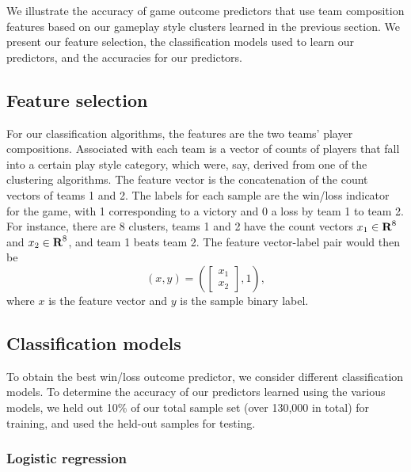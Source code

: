 \documentclass[letterpaper,10 pt,conference]{ieeeconf}
\begin{document}
We illustrate the accuracy of game outcome predictors that use team composition features based on our gameplay style clusters learned in the previous section. We present our feature selection, the classification models used to learn our predictors, and the accuracies for our predictors. 

\subsection{Feature selection}

For our classification algorithms, the features are the two teams' player compositions. Associated with each team is a vector of counts of players that fall into a certain play style category, which were, say, derived from one of the clustering algorithms. The feature vector is the concatenation of the count vectors of teams 1 and 2. The labels for each sample are the win/loss indicator for the game, with 1 corresponding to a victory and 0 a loss by team 1 to team 2. For instance, there are 8 clusters, teams 1 and 2 have the count vectors $x_{1}\in{\mbox{\bf R}}^{8}$ and $x_{2}\in{\mbox{\bf R}}^{8}$, and team 1 beats team 2. The feature vector-label pair would then be 
\[
  \left(x, y\right) = 
  \left(
    \left[
      \begin{array}{c}
        x_{1} \\ 
        x_{2}
      \end{array}
    \right],
    1
  \right),
\]
where $x$ is the feature vector and $y$ is the sample binary label.

\subsection{Classification models}

To obtain the best win/loss outcome predictor, we consider different classification models. To determine the accuracy of our predictors learned using the various models, we held out 10\% of our total sample set (over 130,000 in total) for training, and used the held-out samples for testing. 

\subsubsection{Logistic regression}
\end{document}
